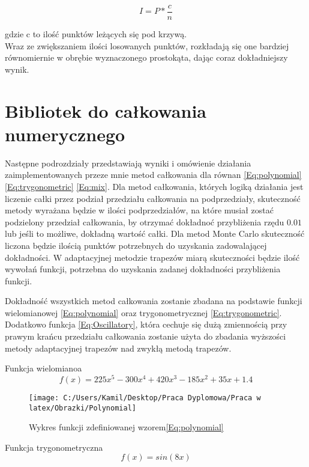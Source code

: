 \documentclass[12pt,twoside]{article}
\begin{document}
\begin{equation}
I = P * \frac{c}{n}
\end{equation}

gdzie c to ilość punktów leżących się pod krzywą.\\

Wraz ze zwiększaniem ilości losowanych punktów, rozkładają się one bardziej równomiernie w obrębie wyznaczonego prostokąta, dając coraz dokładniejszy wynik.\cite{MonteCarlo_2}

\section{Bibliotek do całkowania numerycznego}
Następne podrozdziały przedstawiają wyniki i omówienie działania zaimplementowanych przeze mnie metod całkowania dla równan \eqref{Eq:polynomial} \eqref{Eq:trygonometric} \eqref{Eq:mix}. Dla metod całkowania, których logiką działania jest liczenie całki przez podział przedziału całkowania na podprzedziały, skuteczność metody wyrażana będzie w ilości podprzedziałów, na które musiał zostać podzielony przedział całkowania, by otrzymać dokładnoć przybliżenia rzędu $0.01$ lub jeśli to możliwe, dokładną wartość całki.
Dla metod Monte Carlo skuteczność liczona będzie ilością punktów potrzebnych do uzyskania zadowalającej dokładności.
W adaptacyjnej metodzie trapezów miarą skuteczności będzie ilość wywołań funkcji, potrzebna do uzyskania zadanej dokładności przybliżenia funkcji.


Dokładność wszystkich metod całkowania zostanie zbadana na podstawie funkcji wielomianowej \eqref{Eq:polynomial} oraz trygonometrycznej \eqref{Eq:trygonometric}. Dodatkowo funkcja \eqref{Eq:Oscillatory}, która cechuje się dużą zmiennością przy prawym krańcu przedziału całkowania zostanie użyta do zbadania wyższości metody adaptacyjnej trapezów nad zwykłą metodą trapezów.

Funkcja wielomianoa
\begin{equation}
f(x) = 225x^5 - 300x^4 + 420x^3-185x^2+35x + 1.4
\label{Eq:polynomial}
\end{equation}

\begin{figure}[h]
\texttt{[image: C:/Users/Kamil/Desktop/Praca Dyplomowa/Praca w latex/Obrazki/Polynomial]}
\caption{Wykres funkcji zdefiniowanej wzorem\eqref{Eq:polynomial}}
\end{figure}

Funkcja trygonometryczna
\begin{equation}
f(x) = sin(8x)
\label{Eq:trygonometric}
\end{equation}
\end{document}
